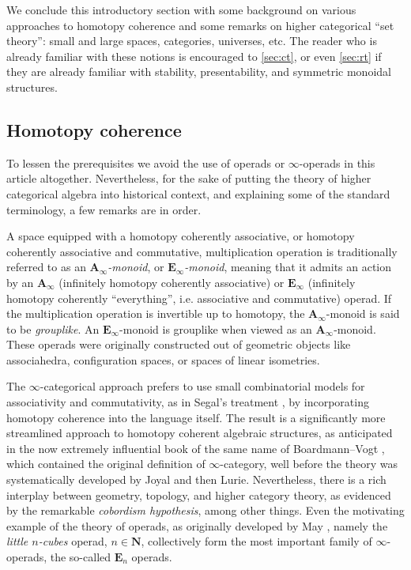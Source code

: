 \documentclass{article}
\theoremstyle{definition}
\renewcommand{\AA}{\mathbf{A}}
\newcommand{\EE}{\mathbf{E}}
\newcommand{\NN}{\mathbf{N}}
\renewcommand{\i}{\infty}
\begin{document}
We conclude this introductory section with some background on various approaches to homotopy coherence and some remarks on higher categorical ``set theory'': small and large spaces, categories, universes, etc.
The reader who is already familiar with these notions is encouraged to \autoref{sec:ct}, or even \autoref{sec:rt} if they are already familiar with stability, presentability, and symmetric monoidal structures.

\subsection{Homotopy coherence}

To lessen the prerequisites we avoid the use of operads or $\infty$-operads in this article altogether.
Nevertheless, for the sake of putting the theory of higher categorical algebra into historical context, and explaining some of the standard terminology, a few remarks are in order.

A space equipped with a homotopy coherently associative, or homotopy coherently associative and commutative, multiplication operation is traditionally referred to as an {\em $\AA_\i$-monoid}, or {\em $\EE_\i$-monoid}, meaning that it admits an action by an $\AA_\i$ (infinitely homotopy coherently associative) or $\EE_\i$ (infinitely homotopy coherently ``everything'', i.e. associative and commutative) operad. If the multiplication operation is invertible up to homotopy, the $\AA_\i$-monoid is said to be {\em grouplike}.
An $\EE_\i$-monoid is grouplike when viewed as an $\AA_\i$-monoid.
These operads were originally constructed out of geometric objects like associahedra, configuration spaces, or spaces of linear isometries.

The $\i$-categorical approach prefers to use small combinatorial models for associativity and commutativity, as in Segal's treatment \cite{Seg74}, by incorporating homotopy coherence into the language itself.
The result is a significantly more streamlined approach to homotopy coherent algebraic structures, as anticipated in the now extremely influential book of the same name of Boardmann--Vogt \cite{BV}, which contained the original definition of $\i$-category, well before the theory was systematically developed by Joyal and then Lurie.
Nevertheless, there is a rich interplay between geometry, topology, and higher category theory, as evidenced by the remarkable {\em cobordism hypothesis}, among other things.
Even the motivating example of the theory of operads, as originally developed by May \cite{May}, namely the {\em little $n$-cubes} operad, $n\in\NN$, collectively form the most important family of $\i$-operads, the so-called $\EE_n$ operads.
\end{document}
